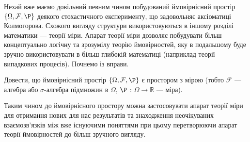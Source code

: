 

Нехай вже маємо довільний певним чином побудований ймовірнісний простір 
$\{\Omega, \mathcal{F}, \P \}$ деякого стохастичного експерименту, що задовольняє 
аксіоматиці Колмогорова. Схожого вигляду структури використовуються в іншому розділі 
математики --- теорії міри. Апарат теорії міри дозволяє побудувати більш концептуально 
логічну та зрозумілу теорію ймовірностей, яку в подальшому буде зручно використовувати в 
більш глибокій математиці (наприклад теорії випадкових процесів). Почнемо із вправи.
\begin{exercise}
    Довести, що ймовірнісний простір $\{\Omega, \mathcal{F}, \P \}$ є простором з 
    мірою (тобто $\mathcal{F}$ --- алгебра або $\sigma$-алгебра підмножин в 
    $\Omega$, $\P$ : $\Omega \rightarrow \mathbb{R}$ --- міра).
\end{exercise}
Таким чином до ймовірнісного простору можна застосовувати апарат теорії міри для 
отримання нових для нас результатів та знаходження неочікуваних 
взаємозв'язків між вже існуючими поняттями при цьому перетворюючи апарат теорії 
ймовірностей до більш зручного вигляду.


